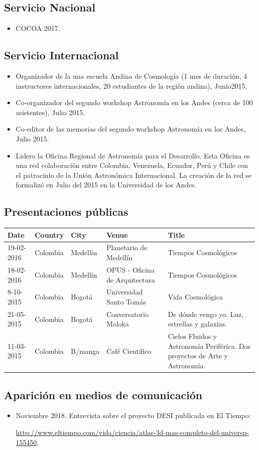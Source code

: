 \documentclass{article}
\begin{document}
\subsection{Servicio Nacional}
\begin{itemize}
\item {COCOA 2017}.
\end{itemize}


\subsection{Servicio Internacional}
\begin{itemize}
\item {Organizador de la una escuela Andina de Cosmolog\'ia (1 mes de
  duraci\'on, 4 instructores internacionales, 20 estudiantes de la
  regi\'on andina), Junio2015.}
\item {Co-organizador del segundo workshop Astronom\'ia en los Andes
  (cerca de 100 asistentes), Julio 2015.}
\item {Co-editor de las memorias del segundo workshop Astronom\'ia en
  los Andes, Julio 2015.}
\item {Lidero la Oficina Regional de Astronom\'ia para el
  Desarrollo. Esta Oficina es una red colaboraci\'on entre Colombia,
  Venezuela, Ecuador, Per\'u y Chile con el patrocinio de la Uni\'on
  Astron\'omica Internacional. La creaci\'on de la red se formaliz\'o
  en Julio del 2015 en la Universidad de los Andes.}   
\end{itemize}

\subsection{Presentaciones p\'ublicas}

\begin{tabular}{p{2.0cm} p{1.5cm} p{1.5cm} p{5.0cm} p{5.0cm}}\hline
Date & Country & City& Venue& Title\\\hline
19-02-2016 & Colombia & Medell\'in & Planetario de Medell\'in & Tiempos Cosmol\'ogicos\\
18-02-2016 & Colombia & Medell\'in & OPUS - Oficina de Arquitectura & Tiempos Cosmol\'ogicos\\
8-10-2015  & Colombia & Bogot\'a & Universidad Santo Tom\'as & Vida Cosmol\'ogica \\
21-05-2015 & Colombia & Bogot\'a & Conversatorio Maloka & De d\'onde vengo yo. Luz, estrellas y galaxias.\\
11-03-2015 & Colombia & B/manga & Caf\'e Cient\'ifico & Cielos Fluidos y Astronom\'ia Perif\'erica. Dos proyectos de Arte y Astronom\'ia.\\\hline
\end{tabular}

\subsection{Aparici\'on en medios de comunicaci\'on}

\begin{itemize}
\item Noviembre 2018. Entrevista sobre el proyecto DESI publicada en El Tiempo:

 \url{http://www.eltiempo.com/vida/ciencia/atlas-3d-mas-completo-del-universp-155450}.
\end{itemize}
\end{document}
